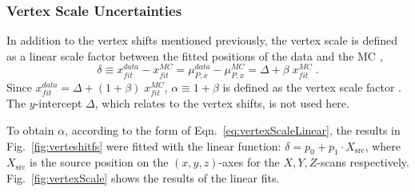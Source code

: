 \subsubsection{Vertex Scale Uncertainties}\label{sect:vertexUncertainties}

In addition to the vertex shifts mentioned previously, the vertex scale is defined as a linear scale factor between the fitted positions of the data and the MC \cite{waterunidoc},
\begin{equation}\label{eq:vertexScaleLinear}
\delta\equiv x^{data}_{fit}-x^{MC}_{fit}=\mu^{data}_{P,x}-\mu^{MC}_{P,x}=\Delta + \beta \; x^{MC}_{fit} \; .
\end{equation}
Since $x^{data}_{fit}=\Delta + (1+\beta) \; x^{MC}_{fit}$, $\alpha\equiv 1+\beta$ is defined as the vertex scale factor \cite{waterunidoc}. The $y$-intercept $\Delta$, which relates to the vertex shifts, is not used here.

To obtain $\alpha$, according to the form of Eqn.~\ref{eq:vertexScaleLinear}, the results in Fig.~\ref{fig:verteshitfs} were fitted with the linear function: $\delta = p_0+p_1 \cdot X_\mathrm{src}$, where $X_\mathrm{src}$ is the source position on the $(x,y,z)$-axes for the $X,Y,Z$-scans respectively. Fig.~\ref{fig:vertexScale} shows the results of the linear fits. %

